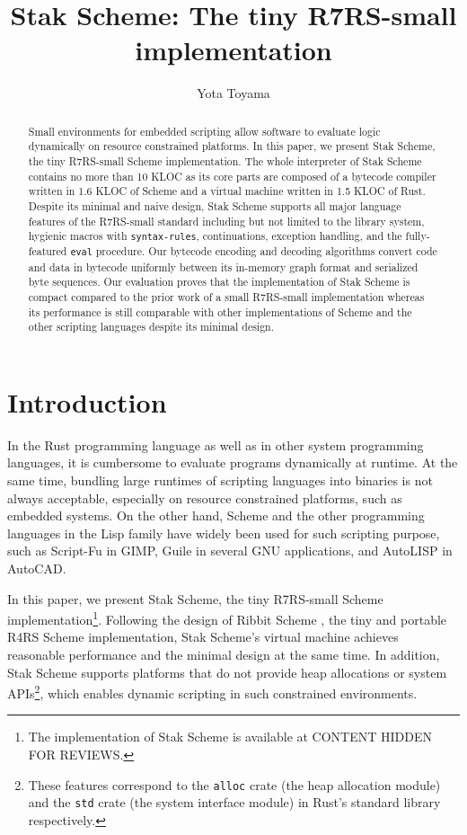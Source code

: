 \documentclass[sigplan]{acmart}
\newcommand{\draft}[1]{CONTENT HIDDEN FOR REVIEWS}
\newcommand{\draft}[1]{#1}
\begin{document}
\title{Stak Scheme: The tiny R7RS-small implementation}
\author{Yota Toyama}

\begin{abstract}
  Small environments for embedded scripting allow software to
  evaluate logic dynamically on resource constrained platforms.
  In this paper, we present Stak Scheme, the tiny R7RS-small
  Scheme implementation.
  The whole interpreter of Stak Scheme contains no more than 10 KLOC as
  its core parts are composed of a bytecode compiler written in 1.6 KLOC
  of Scheme and a virtual machine written in 1.5 KLOC of Rust.
  Despite its minimal and naive design, Stak Scheme
  supports all major language features of the R7RS-small standard including
  but not limited to the library system, hygienic macros with
  \texttt{syntax-rules}, continuations, exception handling, and the
  fully-featured \texttt{eval} procedure.
  Our bytecode encoding and decoding algorithms convert code and
  data in bytecode uniformly
  between its in-memory graph format and serialized byte sequences.
  Our evaluation proves that the implementation of Stak Scheme is
  compact compared to the prior work of a small R7RS-small implementation
  whereas its performance is still
  comparable with other implementations of Scheme and the other
  scripting languages despite its minimal design.
\end{abstract}

\maketitle

\pagestyle{empty}

\section{Introduction}

In the Rust programming language as well as in other system
programming languages, it is cumbersome to evaluate programs
dynamically at runtime. At the same time, bundling large runtimes of
scripting languages into binaries is not always acceptable,
especially on resource constrained platforms, such as embedded systems.
On the other hand, Scheme and the other programming languages in the
Lisp family have widely
been used for such scripting purpose, such as Script-Fu \cite{scriptfu}
in GIMP, Guile \cite{guile} in several GNU applications, and
AutoLISP \cite{autolisp} in AutoCAD.

In this paper, we present Stak Scheme, the tiny R7RS-small Scheme
implementation\footnote{
  The implementation of Stak Scheme is available at
  \draft{\url{https://github.com/raviqqe/stak}}.
}.
Following the design of Ribbit Scheme
\cite{ribbit2023}, the tiny and
portable R4RS Scheme implementation, Stak Scheme's virtual machine
achieves reasonable performance and the minimal design
at the same time.
In addition, Stak Scheme supports platforms that do not provide
heap allocations or system APIs\footnote{
  These features correspond to the \texttt{alloc}
  crate (the heap allocation module) and the \texttt{std} crate (the
  system interface module) in Rust's standard library respectively.
}, which enables dynamic scripting in such constrained environments.
\end{document}
